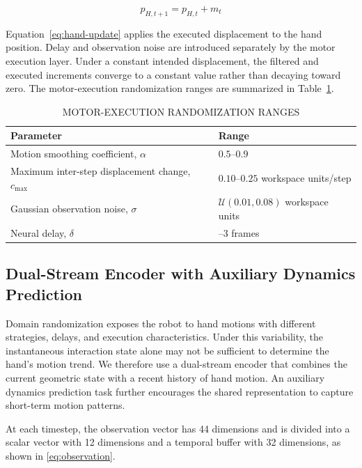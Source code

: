 \documentclass[journal,twoside,web]{ieeecolor2}
\begin{document}
\begin{equation}
p_{H,t+1} = p_{H,t} + m_t
\label{eq:hand-update}
\end{equation}

Equation~\eqref{eq:hand-update} applies the executed displacement to the hand position. Delay and observation noise are introduced separately by the motor execution layer. Under a constant intended displacement, the filtered and executed increments converge to a constant value rather than decaying toward zero. The motor-execution randomization ranges are summarized in Table~\ref{tab:motor-randomization}.

\begin{table}[!t]
\caption{MOTOR-EXECUTION RANDOMIZATION RANGES}
\label{tab:motor-randomization}
\centering
\footnotesize
\renewcommand{\arraystretch}{1.12}
\begin{tabularx}{0.88\textwidth}{@{}>{\raggedright\arraybackslash}X >{\raggedright\arraybackslash}X@{}}
\toprule
Parameter & Range \\
\midrule
Motion smoothing coefficient, $\alpha$ & $0.5$--$0.9$ \\
Maximum inter-step displacement change, $c_{\max}$ & $0.10$--$0.25$ workspace units/step \\
Gaussian observation noise, $\sigma$ & $\mathcal{U}(0.01,0.08)$ workspace units \\
Neural delay, $\delta$ & 0--3 frames \\
\bottomrule
\end{tabularx}
\end{table}

\subsection{Dual-Stream Encoder with Auxiliary Dynamics Prediction}
\label{subsec:dual-stream-encoder}
Domain randomization exposes the robot to hand motions with different strategies, delays, and execution characteristics. Under this variability, the instantaneous interaction state alone may not be sufficient to determine the hand's motion trend. We therefore use a dual-stream encoder that combines the current geometric state with a recent history of hand motion. An auxiliary dynamics prediction task further encourages the shared representation to capture short-term motion patterns.

At each timestep, the observation vector has 44 dimensions and is divided into a scalar vector with 12 dimensions and a temporal buffer with 32 dimensions, as shown in \eqref{eq:observation}.
\end{document}
